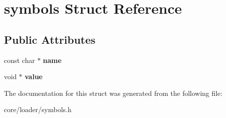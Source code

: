 \hypertarget{structsymbols}{\section{symbols Struct Reference}
\label{structsymbols}
}
\subsection*{Public Attributes}
\begin{DoxyCompactItemize}
\item 
\hypertarget{structsymbols_ad73d3966f0a622b936f9eaee6b603bfc}{const char $\ast$ {\bfseries name}}\label{structsymbols_ad73d3966f0a622b936f9eaee6b603bfc}

\item 
\hypertarget{structsymbols_aa7586550f570c0e7e1aa3455a5875a87}{void $\ast$ {\bfseries value}}\label{structsymbols_aa7586550f570c0e7e1aa3455a5875a87}

\end{DoxyCompactItemize}


The documentation for this struct was generated from the following file\-:\begin{DoxyCompactItemize}
\item 
core/loader/symbols.\-h\end{DoxyCompactItemize}
